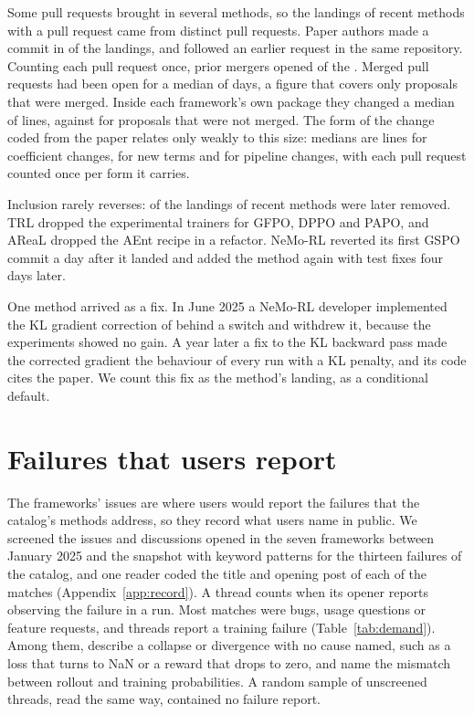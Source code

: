 \documentclass{article}
\begin{document}
Some pull requests brought in several methods, so the \NLandingEvents{} landings of recent methods with a pull request came from \NLandingPRs{} distinct pull requests. Paper authors made a commit in \NLandingAuthor{} of the landings, and \NLandingPriorRequest{} followed an earlier request in the same repository. Counting each pull request once, prior mergers opened \NPRPriorMerger{} of the \NLandingPRs{}. Merged pull requests had been open for a median of \PRDaysOpen{} days, a figure that covers only proposals that were merged. Inside each framework's own package they changed a median of \PRCoreLines{} lines, against \AttemptCoreLines{} for proposals that were not merged. The form of the change coded from the paper relates only weakly to this size: medians are \CoreLinesCoef{} lines for coefficient changes, \CoreLinesTerm{} for new terms and \CoreLinesPipe{} for pipeline changes, with each pull request counted once per form it carries.

Inclusion rarely reverses: \NRemoved{} of the \NRecentLandings{} landings of recent methods were later removed. TRL dropped the experimental trainers for GFPO, DPPO and PAPO, and AReaL dropped the AEnt recipe in a refactor. NeMo-RL reverted its first GSPO commit a day after it landed and added the method again with test fixes four days later.

One method arrived as a fix. In June 2025 a NeMo-RL developer implemented the KL gradient correction of \citet{arxiv250609477} behind a switch and withdrew it, because the experiments showed no gain. A year later a fix to the KL backward pass made the corrected gradient the behaviour of every run with a KL penalty, and its code cites the paper. We count this fix as the method's landing, as a conditional default.

\section{Failures that users report}
\label{sec:demand}

The frameworks' issues are where users would report the failures that the catalog's methods address, so they record what users name in public. We screened the \NIssueUniverse{} issues and discussions opened in the seven frameworks between January 2025 and the snapshot with keyword patterns for the thirteen failures of the catalog, and one reader coded the title and opening post of each of the \NIssueScreened{} matches (Appendix~\ref{app:record}). A thread counts when its opener reports observing the failure in a run. Most matches were bugs, usage questions or feature requests, and \NIssueFailure{} threads report a training failure (Table~\ref{tab:demand}). Among them, \NIssueInstability{} describe a collapse or divergence with no cause named, such as a loss that turns to NaN or a reward that drops to zero, and \NIssueTrainInferMismatch{} name the mismatch between rollout and training probabilities. A random sample of \NIssueRecall{} unscreened threads, read the same way, contained no failure report.
\end{document}
